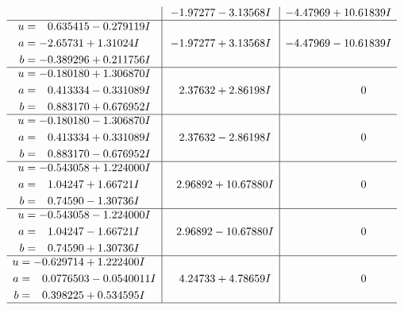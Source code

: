 \documentclass[1p]{elsarticle_modified}
\theoremstyle{definition}
\begin{document}
$$\begin{array}{c|c|c}
 & -1.97277 - 3.13568 I & -4.47969 + 10.61839 I \\ \hline\begin{aligned}
u &= \phantom{-}0.635415 - 0.279119 I \\
a &= -2.65731 + 1.31024 I \\
b &= -0.389296 + 0.211756 I\end{aligned}
 & -1.97277 + 3.13568 I & -4.47969 - 10.61839 I \\ \hline\begin{aligned}
u &= -0.180180 + 1.306870 I \\
a &= \phantom{-}0.413334 - 0.331089 I \\
b &= \phantom{-}0.883170 + 0.676952 I\end{aligned}
 & \phantom{-}2.37632 + 2.86198 I & \phantom{-0.000000 } 0 \\ \hline\begin{aligned}
u &= -0.180180 - 1.306870 I \\
a &= \phantom{-}0.413334 + 0.331089 I \\
b &= \phantom{-}0.883170 - 0.676952 I\end{aligned}
 & \phantom{-}2.37632 - 2.86198 I & \phantom{-0.000000 } 0 \\ \hline\begin{aligned}
u &= -0.543058 + 1.224000 I \\
a &= \phantom{-}1.04247 + 1.66721 I \\
b &= \phantom{-}0.74590 - 1.30736 I\end{aligned}
 & \phantom{-}2.96892 + 10.67880 I & \phantom{-0.000000 } 0 \\ \hline\begin{aligned}
u &= -0.543058 - 1.224000 I \\
a &= \phantom{-}1.04247 - 1.66721 I \\
b &= \phantom{-}0.74590 + 1.30736 I\end{aligned}
 & \phantom{-}2.96892 - 10.67880 I & \phantom{-0.000000 } 0 \\ \hline\begin{aligned}
u &= -0.629714 + 1.222400 I \\
a &= \phantom{-}0.0776503 - 0.0540011 I \\
b &= \phantom{-}0.398225 + 0.534595 I\end{aligned}
 & \phantom{-}4.24733 + 4.78659 I & \phantom{-0.000000 } 0\\
 \hline 
 \end{array}$$\newpage$$\begin{array}{c|c|c}  

\end{array}$$
\end{document}
